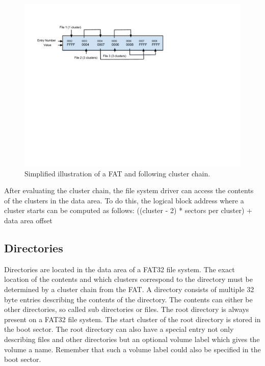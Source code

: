 \begin{figure}[h!]
\caption{Simplified illustration of a FAT and following cluster chain.}
\centering
\includegraphics{figures/cluster_chain}
\end{figure}

After evaluating the cluster chain, the file system driver can access the contents of the clusters in the data area. To do this, the logical block address where a cluster starts can be computed as follows: ((cluster - 2) * sectors per cluster) + data area offset

\subsection{Directories}

Directories are located in the data area of a FAT32 file system. The exact location of the contents and which clusters correspond to the directory must be determined by a cluster chain from the FAT. A directory consists of multiple 32 byte entries describing the contents of the directory. The contents can either be other directories, so called sub directories or files. The root directory is always present on a FAT32 file system. The start cluster of the root directory is stored in the boot sector. The root directory can also have a special entry not only describing files and other directories but an optional volume label which gives the volume a name. Remember that such a volume label could also be specified in the boot sector.

